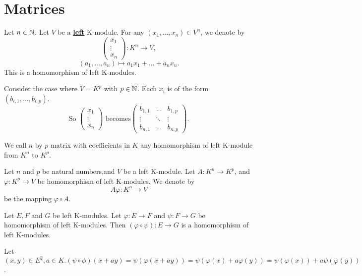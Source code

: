 \documentclass{book}
\numberwithin{equation}{section}
\begin{document}
\section{Matrices}
\begin{definitionenv}
    Let $n\in \mathbb{N}$. Let $V$ be a \underline{\textbf{left}} K-module. For any $(x_1, \dots, x_n)\in V^n$,  we denote by 
    $$\begin{pmatrix}
x_1 \\
 \vdots \\
x_n
\end{pmatrix}
:
K^n\longrightarrow V, $$
$$(a_1, \dots, a_n)\longmapsto a_1x_1+\dots+a_nx_n. $$
This is a homomorphism of left K-modules.
\end{definitionenv}
\begin{exampleenv}
    Consider the case where $V=K^p$ with $p\in \mathbb{N}$. Each $x_i$ is of the form $(b_{i, 1}, \dots, b_{i, p})$.
    $$\text{So } \begin{pmatrix}
x_1 \\
 \vdots \\
x_n
\end{pmatrix}
\text{ becomes}
\begin{pmatrix}
  b_{1, 1}& \dots  &b_{1, p} \\
  \vdots & \ddots  & \vdots \\
  b_{n, 1}& \dots &b_{n, p}
\end{pmatrix} .$$
\end{exampleenv}
\begin{definitionenv}
    We call $n$ by $p$ matrix with coefficients in $K$ any homomorphism of left K-module from $K^n$ to $K^p$.
\end{definitionenv}
\begin{definitionenv}
    Let $n$ and $p$ be natural numbers,and $V$ be a left K-module. Let $A:K^n\rightarrow K^p$, and $\varphi:K^p\rightarrow V$ be homomorphism of left K-modules. We denote by 
    $$A\varphi:K^n\longrightarrow V $$
    be the mapping $\varphi\circ A.$
\end{definitionenv}
\begin{propositionenv}
    Let $E,F$ and $G$ be left K-modules. Let $\varphi:E\rightarrow F$ and $\psi:F\rightarrow G$ be homomorphism of left K-modules. Then $(\varphi\circ \psi):E\rightarrow G$ is a homomorphism of left K-modules.
\end{propositionenv}
\begin{proofenv}
    Let $(x,y)\in E^2, a\in K. (\psi\circ\phi)(x+ay)=\psi(\varphi(x+ay))=\psi(\varphi(x)+a\varphi(y))=\psi(\varphi(x))+a\psi(\varphi(y))$.
\end{proofenv}
\end{document}

